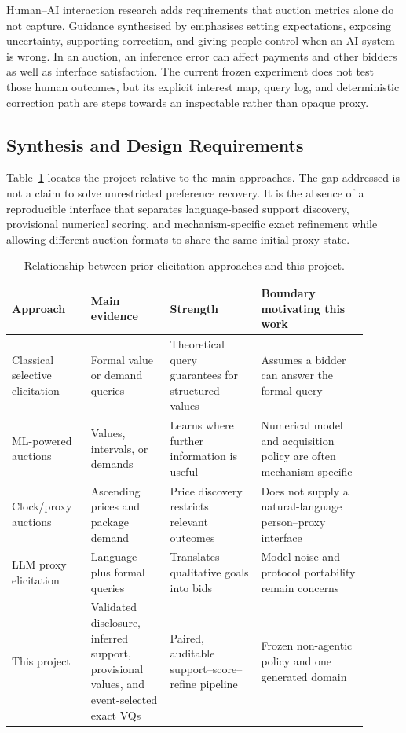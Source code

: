 Human--AI interaction research adds requirements that auction metrics alone do
not capture. Guidance synthesised by \citet{amershi2019guidelines} emphasises
setting expectations, exposing uncertainty, supporting correction, and giving
people control when an AI system is wrong. In an auction, an inference error
can affect payments and other bidders as well as interface satisfaction. The
current frozen experiment does not test those human outcomes, but its explicit
interest map, query log, and deterministic correction path are steps towards
an inspectable rather than opaque proxy.

\subsection{Synthesis and Design Requirements}

Table~\ref{tab:literature-synthesis} locates the project relative to the main
approaches. The gap addressed is not a claim to solve unrestricted preference
recovery. It is the absence of a reproducible interface that separates
language-based support discovery, provisional numerical scoring, and
mechanism-specific exact refinement while allowing different auction formats
to share the same initial proxy state.

\begin{table}[htbp]
\centering
\small
\caption{Relationship between prior elicitation approaches and this project.}
\label{tab:literature-synthesis}
\begin{tabular}{@{}p{0.20\linewidth}p{0.20\linewidth}p{0.23\linewidth}p{0.27\linewidth}@{}}
\toprule
Approach & Main evidence & Strength & Boundary motivating this work \\
\midrule
Classical selective elicitation & Formal value or demand queries & Theoretical query guarantees for structured values & Assumes a bidder can answer the formal query \\
ML-powered auctions & Values, intervals, or demands & Learns where further information is useful & Numerical model and acquisition policy are often mechanism-specific \\
Clock/proxy auctions & Ascending prices and package demand & Price discovery restricts relevant outcomes & Does not supply a natural-language person--proxy interface \\
LLM proxy elicitation & Language plus formal queries & Translates qualitative goals into bids & Model noise and protocol portability remain concerns \\
This project & Validated disclosure, inferred support, provisional values, and event-selected exact VQs & Paired, auditable support--score--refine pipeline & Frozen non-agentic policy and one generated domain \\
\bottomrule
\end{tabular}
\end{table}

